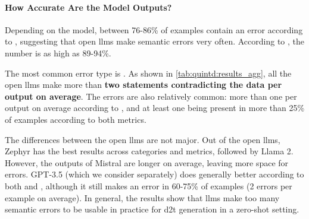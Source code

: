 \paragraph{How Accurate Are the Model Outputs?}
Depending on the model, between 76-86\% of examples contain an error according to \humanmetric, suggesting that open \acp{llm} make semantic errors very often. According to \gptmetric, the number is as high as 89-94\%.

The most common error type is . As shown in \autoref{tab:quintd:results_agg}, all the open \acp{llm} make more than \textbf{two statements contradicting the data per output on average}. The  errors are also relatively common: more than one per output on average according to \humanmetric, and at least one being present in more than 25\% of examples according to both metrics.


The differences between the open \acp{llm} are not major. Out of the open \acp{llm}, Zephyr has the best results across categories and metrics, followed by Llama 2. However, the outputs of Mistral are longer on average, leaving more space for errors. GPT-3.5 (which we consider separately) does generally better according to both \gptmetric and \humanmetric, although it still makes an error in 60-75\% of examples (2 errors per example on average). In general, the results show that \acp{llm} make too many semantic errors to be usable in practice for \ac{d2t} generation in a zero-shot setting.



